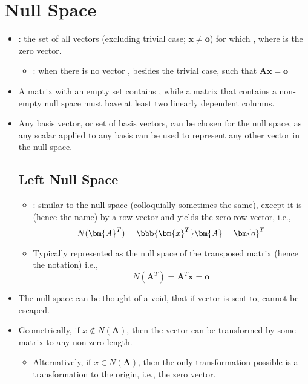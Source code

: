 \section{Null Space}\label{Null Space}
\begin{itemize}
  \item {}: the set of all vectors  (excluding trivial case; \(\bm{x}\neq \bm{o}\)) for which , where  is the zero vector.
    \begin{itemize}
      \item {}: when there is no vector , besides the trivial case, such that \(\bm{Ax} = \bm{o}\)
    \end{itemize}
  \item A matrix with an empty set contains \hyperref[Linear Independence]{}, while a matrix that contains a non-empty null space must have at least two linearly dependent columns.
  \item Any basis vector, or set of basis vectors, can be chosen for the null space, as any scalar applied to any basis can be used to represent any other vector in the null space.

  \subsection{Left Null Space}\label{Left Null Space}
  \begin{itemize}
    \item {}: similar to the null space (colloquially sometimes the same), except it is  (hence the name) by a row vector and yields the zero row vector, i.e.,
    \[%
    N(\bm{A}^T) = \bbb{\bm{x}^T} \bm{A} = \bm{o}^T  
    \]%
    \item Typically represented as the null space of the transposed matrix (hence the notation) i.e.,
    \[%
    N(\bm{A}^T) = \bm{A}^T \bm{x} = \bm{o}
    \]%
  \end{itemize}
  \item The null space can be thought of a void, that if vector is sent to, cannot be escaped. 
  \item Geometrically, if \(x \notin N(\bm{A}) \), then the vector can be transformed by some matrix to any non-zero length.
    \begin{itemize}
      \item Alternatively, if \(x \in N(\bm{A})\), then the only transformation possible is a transformation to the origin, i.e., the zero vector.
    \end{itemize}
\end{itemize}

